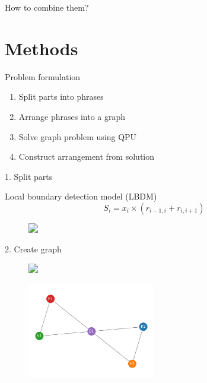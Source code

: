 \documentclass[handout]{beamer}
\begin{document}
\begin{frame}[standout]
    \centering
    How to combine them?
\end{frame}

\section{Methods}

\begin{frame}{Problem formulation}
    \begin{enumerate}
        \item<2-> Split parts into phrases
        \item<3-> Arrange phrases into a graph
        \item<4-> Solve graph problem using QPU
        \item<5-> Construct arrangement from solution
    \end{enumerate}
\end{frame}

\begin{frame}{1. Split parts}
    \begin{block}{}
        \centering
        Local boundary detection model (LBDM)
        \begin{equation*}
            S_i=x_i\times (r_{i-1, i} + r_{i, i+1})
        \end{equation*}
    \end{block}
    \begin{figure}
        \centering
        \includegraphics<1->[width=0.8\textwidth]{../Figures/toy-1.png}
    \end{figure}
\end{frame}

\begin{frame}{2. Create graph}

    \begin{figure}
        \centering
        \includegraphics<1->[width=0.8\textwidth]{../Figures/toy-1.png}
    \end{figure}
    \begin{figure}
        \centering
        \includegraphics[width=0.5\textwidth]{../Figures/toy_graph.pdf}
    \end{figure}
\end{frame}
\end{document}

